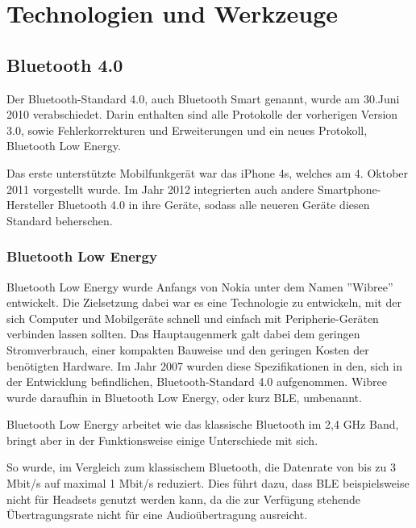 \chapter{Technologien und Werkzeuge}
\label{chap:technologies}

\section{Bluetooth 4.0}
\label{sec:technologies:bluetooth4}

Der Bluetooth-Standard 4.0, auch Bluetooth Smart genannt, wurde am 30.Juni 2010 verabschiedet. Darin enthalten sind alle Protokolle der vorherigen Version 3.0, sowie Fehlerkorrekturen und Erweiterungen und ein neues Protokoll, Bluetooth Low Energy. 

Das erste unterstützte Mobilfunkgerät war das iPhone 4s, welches am 4. Oktober 2011 vorgestellt wurde. Im Jahr 2012 integrierten auch andere Smartphone-Hersteller Bluetooth 4.0 in ihre Geräte, sodass alle neueren Geräte diesen Standard beherschen.


\subsection{Bluetooth Low Energy}
\label{sec:technologies:bluetoothLE}

Bluetooth Low Energy wurde Anfangs von Nokia unter dem Namen ''Wibree'' entwickelt. Die Zielsetzung dabei war es eine Technologie zu entwickeln, mit der sich Computer und Mobilgeräte schnell und einfach mit Peripherie-Geräten verbinden lassen sollten. Das Hauptaugenmerk galt dabei dem geringen Stromverbrauch, einer kompakten Bauweise und den geringen Kosten der benötigten Hardware.
Im Jahr 2007 wurden diese Spezifikationen in den, sich in der Entwicklung befindlichen, Bluetooth-Standard 4.0 aufgenommen. Wibree wurde daraufhin in Bluetooth Low Energy, oder kurz BLE, umbenannt.

Bluetooth Low Energy arbeitet wie das klassische Bluetooth im 2,4 GHz Band, bringt aber in der Funktionsweise einige Unterschiede mit sich.

So wurde, im Vergleich zum klassischem Bluetooth, die Datenrate von bis zu 3 Mbit/s auf maximal 1 Mbit/s reduziert. Dies führt dazu, dass BLE beispielsweise nicht für Headsets genutzt werden kann, da die zur Verfügung stehende Übertragungsrate nicht für eine Audioübertragung ausreicht.

